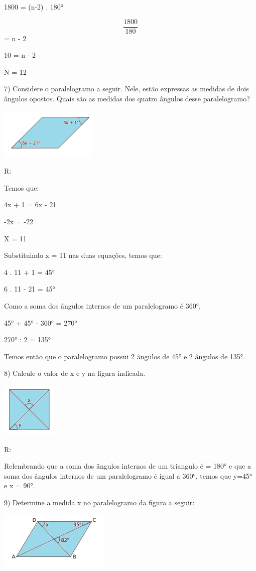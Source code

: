 1800 = (n-2) . 180°

\[\frac{1800}{180}\] = n - 2

10 = n - 2

N = 12

7) Considere o paralelogramo a seguir. Nele, estão expressas as medidas
de dois ângulos opostos. Quais são as medidas dos quatro ângulos desse
paralelogramo?

\includegraphics[width=1.82292in,height=0.95833in]{./imgSAEB_8_MAT/media/image9.png}

R:

Temos que:

4x + 1 = 6x - 21

-2x = -22

X = 11

Substituindo x = 11 nas duas equações, temos que:

4 . 11 + 1 = 45°

6 . 11 - 21 = 45°

Como a soma dos ângulos internos de um paralelogramo é 360°,

45° + 45° - 360° = 270°

270° : 2 = 135°

Temos então que o paralelogramo possui 2 ângulos de 45° e 2 ângulos de
135°.

8) Calcule o valor de x e y na figura indicada.

\includegraphics[width=1.03125in,height=1.03125in]{./imgSAEB_8_MAT/media/image10.png}

R:

Relembrando que a soma dos ângulos internos de um triangulo é = 180° e
que a soma dos ângulos internos de um paralelogramo é igual a 360°,
temos que y=45° e x = 90°.

9) Determine a medida x no paralelogramo da figura a seguir:

\includegraphics[width=2.05208in,height=1.09375in]{./imgSAEB_8_MAT/media/image11.png}

